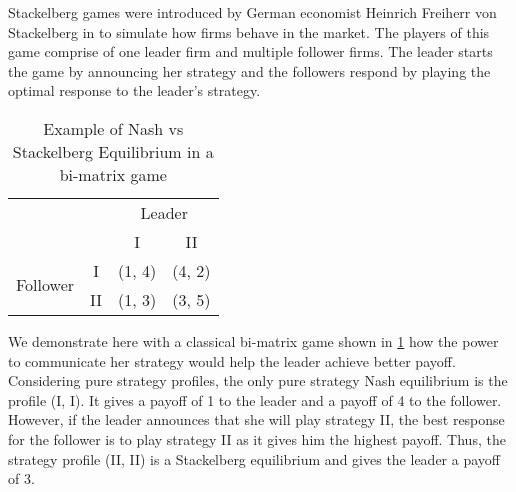 
Stackelberg games were introduced by German economist Heinrich Freiherr von Stackelberg in \cite{S34} to simulate how firms behave in the market. The players of this game comprise of one leader firm and multiple follower firms. The leader starts the game by announcing her strategy and the followers respond by playing the optimal response to the leader's strategy.

\begin{table}[h]
    \centering
    \begin{tabular}{ll|c|c|}
        \cline{3-4}
        & & \multicolumn{2}{c|}{Leader} \\ 
        \cline{3-4} 
        & & I & II \\ 
        \hline
        \multicolumn{1}{|c|}{\multirow{2}{*}{Follower}} & \multicolumn{1}{c|}{I}  & (1, 4) & (4, 2)\\ 
        \cline{2-4} 
        \multicolumn{1}{|c|}{} & \multicolumn{1}{c|}{II} & (1, 3) & (3, 5) \\
        \hline
    \end{tabular}
    \caption{Example of Nash vs Stackelberg Equilibrium in a bi-matrix game}
    \label{tab:bi-matrix-game}
\end{table}

We demonstrate here with a classical bi-matrix game shown in \cref{tab:bi-matrix-game} how the power to communicate her strategy would help the leader achieve better payoff. Considering pure strategy profiles, the only pure strategy Nash equilibrium is the profile (I, I). It gives a payoff of 1 to the leader and a payoff of 4 to the follower. However, if the leader announces that she will play strategy II, the best response for the follower is to play strategy II as it gives him the highest payoff. Thus, the strategy profile (II, II) is a Stackelberg equilibrium and gives the leader a payoff of 3.

